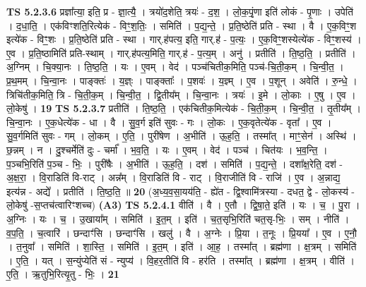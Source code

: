 \documentclass[17pt]{extarticle}
\begin{document}
                  \newline
                                \textbf{ TS 5.2.3.6} \newline
                  प्रज्ञा᳚त्या॒ इति॒ प्र - ज्ञा॒त्यै॒ । त्रयो॑द॒शेति॒ त्रयः॑ - द॒श॒ । लो॒क॒पृं॒णा इति॑ लोकं - पृ॒णाः । उपेति॑ । द॒धा॒ति॒ । एक॑विꣳशति॒रित्येक॑ - विꣳ॒॒श॒तिः॒ । समिति॑ । प॒द्य॒न्ते॒ । प्र॒ति॒ष्ठेति॑ प्रति - स्था । वै । ए॒क॒विꣳ॒॒श इत्ये॑क - विꣳ॒॒शः । प्र॒ति॒ष्ठेति॑ प्रति - स्था । गार्.ह॑पत्य॒ इति॒ गार्.ह॑ - प॒त्यः॒ । ए॒क॒विꣳ॒॒शस्येत्ये॑क - विꣳ॒॒शस्य॑ । ए॒व । प्र॒ति॒ष्ठामिति॑ प्रति-स्थाम् । गार्.ह॑पत्य॒मिति॒ गार्.ह॑ - प॒त्य॒म् । अनु॑ । प्रतीति॑ । ति॒ष्ठ॒ति॒ । प्रतीति॑ । अ॒ग्निम् । चि॒क्या॒नः । ति॒ष्ठ॒ति॒ । यः । ए॒वम् । वेद॑ । पञ्च॑चितीक॒मिति॒ पञ्च॑-चि॒ती॒क॒म् । चि॒न्वी॒त॒ । प्र॒थ॒मम् । चि॒न्वा॒नः । पाङ्क्तः॑ । य॒ज्ञ्ः । पाङ्क्ताः᳚ । प॒शवः॑ । य॒ज्ञ्म् । ए॒व । प॒शून् । अवेति॑ । रु॒न्धे॒ । त्रिचि॑तीक॒मिति॒ त्रि - चि॒ती॒क॒म् । चि॒न्वी॒त॒ । द्वि॒तीय᳚म् । चि॒न्वा॒नः । त्रयः॑ । इ॒मे । लो॒काः । ए॒षु । ए॒व । लो॒केषु॑ । \textbf{  19} \newline
                  \newline
                                \textbf{ TS 5.2.3.7} \newline
                  प्रतीति॑ । ति॒ष्ठ॒ति॒ । एक॑चितीक॒मित्येक॑ - चि॒ती॒क॒म् । चि॒न्वी॒त॒ । तृ॒तीय᳚म् । चि॒न्वा॒नः । ए॒क॒धेत्ये॑क - धा । वै । सु॒व॒र्ग इति॑ सुवः - गः । लो॒कः । ए॒क॒वृतेत्ये॑क - वृता᳚ । ए॒व । सु॒व॒र्गमिति॑ सुवः - गम् । लो॒कम् । ए॒ति॒ । पुरी॑षेण । अ॒भीति॑ । ऊ॒ह॒ति॒ । तस्मा᳚त् । माꣳ॒॒सेन॑ । अस्थि॑ । छ॒न्नम् । न । दु॒श्चर्मेति॑ दुः - चर्मा᳚ । भ॒व॒ति॒ । यः । ए॒वम् । वेद॑ । पञ्च॑ । चित॑यः । भ॒व॒न्ति॒ । प॒ञ्चभि॒रिति॑ प॒ञ्च - भिः॒ । पुरी॑षैः । अ॒भीति॑ । ऊ॒ह॒ति॒ । दश॑ । समिति॑ । प॒द्य॒न्ते॒ । दशा᳚क्ष॒रेति॒ दश॑ - अ॒क्ष॒रा॒ । वि॒राडिति॑ वि-राट् । अन्न᳚म् । वि॒राडिति॑ वि - राट् । वि॒राजीति॑ वि - राजि॑ । ए॒व । अ॒न्नाद्य॒ इत्य॑न्न - अद्ये᳚ । प्रतीति॑ । ति॒ष्ठ॒ति॒ ॥ \textbf{  20 } \newline
                  \newline
                      (अ॒ध्य॒व॒सा॒यय॑ति॒ - ह्ये॑त - द्वि॒श्वामि॑त्रस्या - दधत॒ द्वे - लो॒कस्य॑ - लो॒केषु॑ -स॒प्तच॑त्वारिꣳशच्च)  \textbf{(A3)} \newline \newline
                                \textbf{ TS 5.2.4.1} \newline
                  वीति॑ । वै । ए॒तौ । द्वि॒षा॒ते॒ इति॑ । यः । च॒ । पु॒रा । अ॒ग्निः । यः । च॒ । उ॒खाया᳚म् । समिति॑ । इ॒त॒म् । इति॑ । च॒त॒सृभि॒रिति॑ चत॒सृ-भिः॒ । सम् । नीति॑ । व॒प॒ति॒ । च॒त्वारि॑ । छन्दाꣳ॑सि । छन्दाꣳ॑सि । खलु॑ । वै । अ॒ग्नेः । प्रि॒या । त॒नूः । प्रि॒यया᳚ । ए॒व । ए॒नौ॒ । त॒नुवा᳚ । समिति॑ । शा॒स्ति॒ । समिति॑ । इ॒त॒म् । इति॑ । आ॒ह॒ । तस्मा᳚त् । ब्रह्म॑णा । क्ष॒त्रम् । समिति॑ । ए॒ति॒ । यत् । स॒न्युंप्येति॑ सं - न्युप्य॑ । वि॒हर॒तीति॑ वि - हर॑ति । तस्मा᳚त् । ब्रह्म॑णा । क्ष॒त्रम् । वीति॑ । ए॒ति॒ । ऋ॒तुभि॒रित्यृ॒तु - भिः॒ । \textbf{  21} \newline
\end{document}
